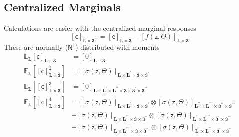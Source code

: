 \documentclass[preprint,12pt]{elsarticle}
\newcommand*{\M}[1]{\ensuremath{#1}\xspace}
\newcommand*{\x}{\times}
\newcommand*{\mi}[1]{\mathbf{#1}}
\newcommand*{\rv}[1]{\mathsf{#1}}
\newcommand*{\te}[2][]{\left\lbrack{#2}\right\rbrack_{#1}}
\newcommand*{\deq}{\M{\mathrel{\mathop:}=}}
\newcommand*{\ev}[3][]{\mathbb{E}_{#3}^{#1}\!\left\lbrack{#2}\right\rbrack}
\newcommand*{\evt}[3][]{\mathbb{E}_{#3}^{#1}\!#2}
\begin{document}
        \subsection{Centralized Marginals} \label{sub:ROM:CentralMarg}
            Calculations are easier with the centralized marginal responses
            \begin{equation*}
                \te[\mi{L\x 3}]{\rv{c}} \deq \te[\mi{L\x 3}]{\rv{e}} - \te[\mi{L\x 3}]{f(\rv{z},\Theta)}
            \end{equation*}
            These are normally ($\mathsf{N}^{\dagger}$) distributed with moments \cite{Isserlis1916,Isserlis1918}
            \begin{equation} \label{eq:ROM:CentralMarg:Moments}
                \begin{aligned}
                    \evt{\te[\mi{L\x 3}]{\rv{c}}}{\mi{L}} &= \te[\mi{L\x 3}]{0} \\
                    \ev{\te[\mi{L\x 3}]{\rv{c}}^{2}}{\mi{L}} &= \te[\mi{L\x L^{\prime}\x 3\x 3^{\prime}}]{\sigma(\rv{z},\Theta)} \\
                    \ev{\te[\mi{L\x 3}]{\rv{c}}^{3}}{\mi{L}} &= \te[\mi{L\x L^{\prime}\x L^{\prime\prime}\x 3\x 3^{\prime}\x 3^{\prime\prime}}]{0} \\
                    \ev{\te[\mi{L\x 3}]{\rv{c}}^{4}}{\mi{L}} &= 
                    \te[\mi{L\x L^{\prime}\x 3\x 3^{\prime}}]{\sigma(\rv{z},\Theta)} \otimes
                    \te[\mi{L^{\prime\prime}\x L^{\prime\prime\prime}\x 3^{\prime\prime}\x 3^{\prime\prime\prime}}]{\sigma(\rv{z},\Theta)} \\
                    &+ \te[\mi{L\x L^{\prime\prime}\x 3\x 3^{\prime\prime}}]{\sigma(\rv{z},\Theta)} \otimes
                    \te[\mi{L^{\prime}\x L^{\prime\prime\prime}\x 3^{\prime}\x 3^{\prime\prime\prime}}]{\sigma(\rv{z},\Theta)} \\
                    &+ \te[\mi{L\x L^{\prime\prime\prime}\x 3\x 3^{\prime\prime\prime}}]{\sigma(\rv{z},\Theta)} \otimes
                    \te[\mi{L^{\prime}\x L^{\prime\prime}\x 3^{\prime}\x 3^{\prime\prime}}]{\sigma(\rv{z},\Theta)}
                \end{aligned}
            \end{equation}
\end{document}
